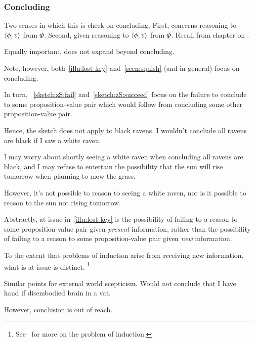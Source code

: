 \subsubsection{Concluding}

\begin{note}
  Two senses in which this is check on concluding.
  First, concerns reasoning to \(\langle \phi, v \rangle\) from \(\Phi\).
  Second, given reasoning to \(\langle \phi, v \rangle\) from \(\Phi\).
  Recall from chapter on .
\end{note}

\begin{note}
  Equally important, does not expand beyond concluding.
\end{note}

\begin{note}
  Note, however, both~\autoref{illu:lost-key} and~\autoref{scen:squish} (and  in general) focus on concluding.

  In turn, ~\ref{sketch:zS:fail} and~\ref{sketch:zS:succeed} focus on the failure to conclude to some proposition-value pair which would follow from concluding some other proposition-value pair.

  Hence, the sketch does not apply to black ravens.
  I wouldn't conclude all ravens are black if I saw a white raven.

  I may worry about shortly seeing a white raven when concluding all ravens are black, and I may refuse to entertain the possibility that the sun will rise tomorrow when planning to mow the grass.

  However, it's not possible to reason to seeing a white raven, nor is it possible to reason to the sun not rising tomorrow.

  Abstractly, at issue in~\autoref{illu:lost-key} is the possibility of failing to a reason to some proposition-value pair given \emph{present} information, rather than the possibility of failing to a reason to some proposition-value pair given \emph{new} information.

  To the extent that problems of induction arise from receiving new information, what is at issue is distinct.%
  \footnote{
    See~\textcite{Henderson:2020wb} for more on the problem of induction.
  }

  Similar points for external world scepticism.
  Would not conclude that I have hand if disembodied brain in a vat.

  However, conclusion is out of reach.
\end{note}

